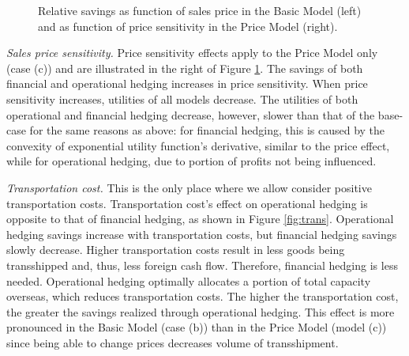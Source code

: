 \documentclass[mnsc,nonblindrev,copyedit]{informs2_wz} %
\begin{document}
\begin{figure}[ht]
\begin{center}
\begin{minipage}{6in}
    \begin{minipage}{3.1in}
        \epsfxsize=2.8in
    \hspace{-0.0in}    
    \end{minipage}
    \begin{minipage}{2.8in}
        \epsfxsize=2.8in
    \hspace{-0.0in}    
    \end{minipage}
\end{minipage}
\vspace{.05in} \caption{Relative savings as function of sales price in the Basic Model (left) and as function of price sensitivity in the Price Model (right).} \label{fig:priceAndSens}
\vspace{-.2in}
\end{center}
\end{figure}



{\noindent \em Sales price sensitivity.} Price sensitivity effects apply to the Price Model only (case (c)) and are illustrated in the right of Figure \ref{fig:priceAndSens}.  The savings of both financial and operational hedging increases in price sensitivity.  When price sensitivity increases, utilities of all models decrease.  The utilities of both operational and financial hedging decrease, however, slower than that of the base-case for the same reasons as above:  for financial hedging, this is caused by the convexity of exponential utility function's derivative, similar to the price effect, while for operational hedging, due to portion of profits not being influenced.



{\noindent \em Transportation cost.}  This is the only place where we allow consider positive transportation costs.  Transportation cost's effect
on operational hedging is opposite to that of  financial hedging,
as shown in Figure \ref{fig:trans}.  Operational hedging savings increase with transportation costs, but financial hedging savings slowly decrease.  Higher transportation costs result in less goods being transshipped and, thus, less foreign cash flow.  Therefore, financial hedging is less needed.
 Operational hedging optimally allocates a portion of total capacity overseas, which reduces transportation costs.  The higher the transportation cost, the greater the savings realized through operational hedging.  This effect is more pronounced in the Basic Model (case (b)) than in the Price Model (model (c)) since being able to change prices decreases volume of transshipment.
\end{document}
